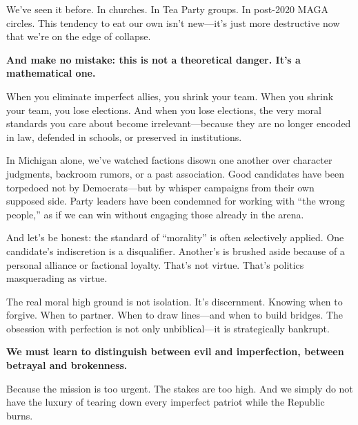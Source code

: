 We’ve seen it before. In churches. In Tea Party groups. In post-2020 MAGA circles. This tendency to eat our own isn't new—it’s just more destructive now that we're on the edge of collapse. 

\textbf{And make no mistake: this is not a theoretical danger. It's a mathematical one.}

When you eliminate imperfect allies, you shrink your team. When you shrink your team, you lose elections. And when you lose elections, the very moral standards you care about become irrelevant—because they are no longer encoded in law, defended in schools, or preserved in institutions.

In Michigan alone, we’ve watched factions disown one another over character judgments, backroom rumors, or a past association. Good candidates have been torpedoed not by Democrats—but by whisper campaigns from their own supposed side. Party leaders have been condemned for working with ``the wrong people,'' as if we can win without engaging those already in the arena.

And let’s be honest: the standard of ``morality'' is often selectively applied. One candidate’s indiscretion is a disqualifier. Another’s is brushed aside because of a personal alliance or factional loyalty. That’s not virtue. That’s politics masquerading as virtue.

The real moral high ground is not isolation. It’s discernment. Knowing when to forgive. When to partner. When to draw lines—and when to build bridges. The obsession with perfection is not only unbiblical—it is strategically bankrupt.

\textbf{We must learn to distinguish between evil and imperfection, between betrayal and brokenness.}

Because the mission is too urgent. The stakes are too high. And we simply do not have the luxury of tearing down every imperfect patriot while the Republic burns.
